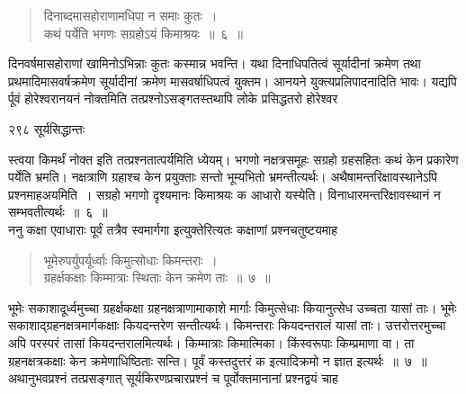 \documentclass[11pt, openany]{book}
\begin{document}


\begin{quote}
  {\ssi दिनाब्दमासहोराणामधिपा न समाः कुतः~।\\
कथं पर्येति भगणः सग्रहोऽयं किमाश्रयः~॥~६~॥}
\end{quote}

 दिनवर्षमासहोराणां खामिनोऽभिन्नाः कुतः कस्मान्न भवन्ति। यथा दिनाधिपतित्वं सूर्यादीनां क्रमेण तथा प्रथमादिमासवर्षक्रमेण सूर्यादीनां क्रमेण मासवर्षाधिपत्वं युक्तम। आनयने युक्त्यप्रलिपादनादिति भावः। यद्यपि र्पूवं होरेश्वरानयनं नोक्तमिति तत्प्रश्नोऽसङ्गतस्तथापि लोके प्रसिद्धतरो होरेश्वर\textendash



\newpage


\noindent २९८ \hspace{4cm} सूर्यसिद्धान्तः
\vspace{1cm}


\noindent स्त्वया किमर्थं नोक्त इति तत्प्रश्नतात्पर्यमिति ध्येयम्। भगणो नक्षत्रसमूहः सग्रहो ग्रहसहितः कथं केन प्रकारेण पर्येति भ्रमति। नक्षत्राणि ग्रहाश्च केन प्रयुक्ताः सन्तो भूम्यभितो भ्रमन्तीत्यर्थः। अथैषामन्तरिक्षावस्थानेऽपि प्रश्नमाह\textendash अयमिति~। सग्रहो भगणो दृश्यमानः किमाश्रयः क आधारो यस्येति। विनाधारमन्तरिक्षावस्थानं न सम्भवतीत्यर्थः~॥~६~॥\\
\noindent ननु कक्षा एवाधाराः पूर्वं तत्रैव स्वमार्गगा इत्युक्तेरित्यतः कक्षाणां प्रश्नचतुष्टयमाह\textendash 


\begin{quote}
 {\ssi भूमेरुपर्युपर्यूर्ध्वाः किमुत्सोधाः किमन्तराः~।\\
ग्रहर्क्षकक्षाः किम्मात्राः स्थिताः केन क्रमेण ताः~॥~७~॥}
\end{quote}

 भूमेः सकाशादूर्ध्वमुच्चा ग्रहर्क्षकक्षा ग्रहनक्षत्राणामाकाशे मार्गाः किमुत्सेधाः कियानुत्सेध उच्चता यासां ताः। भूमेः सकाशाद्ग्रहनक्षत्रमार्गकक्षाः कियदन्तरेण सन्तीत्यर्थः। किमन्तराः कियदन्तरालं यासां ताः। उत्तरोत्तरमुच्चा अपि परस्परं तासां कियदन्तरालमित्यर्थः। किम्मात्राः किमात्मिका।  किंस्वरूपाः किम्प्रमाणा वा। ता ग्रहनक्षत्रकक्षाः केन क्रमेणाधिष्ठिताः सन्ति। पूर्वं कस्तदुत्तरं क इत्यादिक्रमो न ज्ञात इत्यर्थः~॥~७~॥\\
\noindent अथानुभवप्रश्नं तत्प्रसङ्गात् सूर्यकिरणप्रचारप्रश्नं च पूर्वोक्तमानानां प्रश्नद्वयं चाह\textendash 
\end{document}
